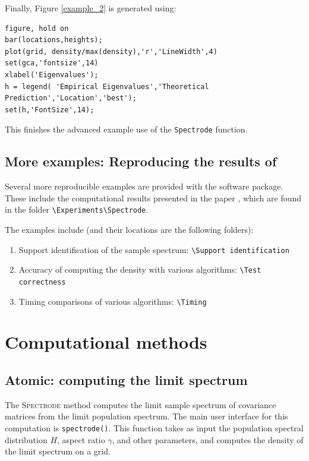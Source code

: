 \documentclass[english,11pt]{article} %
\begin{document}
Finally, Figure \ref{example_2} is generated using:


\begin{verbatim}
figure, hold on
bar(locations,heights);
plot(grid, density/max(density),'r','LineWidth',4)
set(gca,'fontsize',14)
xlabel('Eigenvalues');
h = legend( 'Empirical Eigenvalues','Theoretical Prediction','Location','best');
set(h,'FontSize',14);
\end{verbatim}

This finishes the advanced example use of the \verb+Spectrode+ function. 

\subsection{More examples: Reproducing the results of \cite{dobriban2015precise}}

Several more reproducible examples are provided with the software package. These include the computational results presented in the paper \cite{dobriban2015precise}, which are found in the folder \verb+\Experiments\Spectrode+. 

The examples include (and their locations are the following folders):

\begin{enumerate}
\item Support identification of the sample spectrum: \verb+\Support identification+
\item Accuracy of computing the density with various algorithms: \verb+\Test correctness+
\item Timing comparisons of various algorithms: \verb+\Timing+ 
\end{enumerate}



\section{Computational methods}
\label{methods}

\subsection{Atomic: computing the limit spectrum}
\label{atomic_description}

The \textsc{Spectrode} method computes the limit sample spectrum of covariance matrices from the limit population spectrum. The  main user interface for this computation is \verb+spectrode()+. This function takes as input the population spectral distribution $H$, aspect ratio $\gamma$, and other parameters, and computes the density of the limit spectrum on a grid. 
\end{document}
